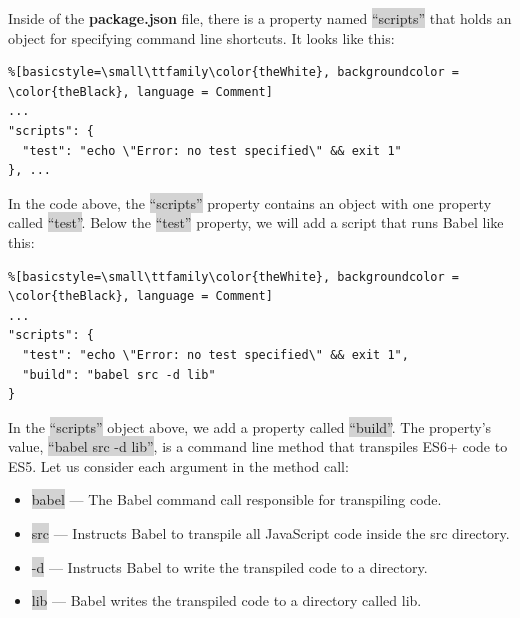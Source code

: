 \documentclass[11pt]{article}
\begin{document}
Inside of the \textbf{package.json} file, there is a property named \colorbox{lightgray}{``scripts''} that holds an object for specifying command line shortcuts. It looks like this:
\begin{lstlisting}%[basicstyle=\small\ttfamily\color{theWhite}, backgroundcolor = \color{theBlack}, language = Comment]
...
"scripts": {
  "test": "echo \"Error: no test specified\" && exit 1"
}, ...
\end{lstlisting}
In the code above, the \colorbox{lightgray}{``scripts''} property contains an object with one property called \colorbox{lightgray}{``test''}. Below the \colorbox{lightgray}{``test''} property, we will add a script that runs Babel like this:
\begin{lstlisting}%[basicstyle=\small\ttfamily\color{theWhite}, backgroundcolor = \color{theBlack}, language = Comment]
...
"scripts": {
  "test": "echo \"Error: no test specified\" && exit 1",
  "build": "babel src -d lib"
}
\end{lstlisting}
In the \colorbox{lightgray}{``scripts''} object above, we add a property called \colorbox{lightgray}{``build''}. The property’s value, \colorbox{lightgray}{``babel src -d lib''}, is a command line method that transpiles ES6+ code to ES5. Let us consider each argument in the method call:
\begin{itemize}[leftmargin = *]
\item \colorbox{lightgray}{babel} — The Babel command call responsible for transpiling code.
\item \colorbox{lightgray}{src} — Instructs Babel to transpile all JavaScript code inside the src directory.
\item \colorbox{lightgray}{-d} — Instructs Babel to write the transpiled code to a directory.
\item \colorbox{lightgray}{lib} — Babel writes the transpiled code to a directory called lib.
\end{itemize}
\end{document}
